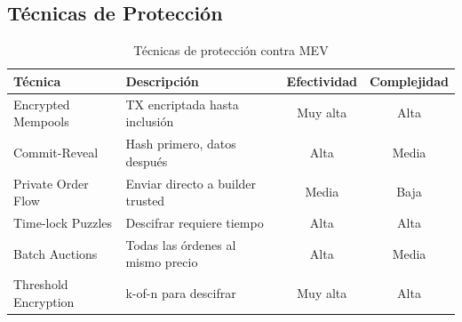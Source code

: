 \documentclass[11pt,a4paper,twoside]{book}
\theoremstyle{definition}
\theoremstyle{remark}
\begin{document}
\subsection{Técnicas de Protección}

\begin{table}[htbp]
\centering
\small
\begin{tabular}{lp{4cm}cc}
\toprule
\textbf{Técnica} & \textbf{Descripción} & \textbf{Efectividad} & \textbf{Complejidad} \\
\midrule
Encrypted Mempools & TX encriptada hasta inclusión & Muy alta & Alta \\
Commit-Reveal & Hash primero, datos después & Alta & Media \\
Private Order Flow & Enviar directo a builder trusted & Media & Baja \\
Time-lock Puzzles & Descifrar requiere tiempo & Alta & Alta \\
Batch Auctions & Todas las órdenes al mismo precio & Alta & Media \\
Threshold Encryption & k-of-n para descifrar & Muy alta & Alta \\
\bottomrule
\end{tabular}
\caption{Técnicas de protección contra MEV}
\end{table}
\end{document}
